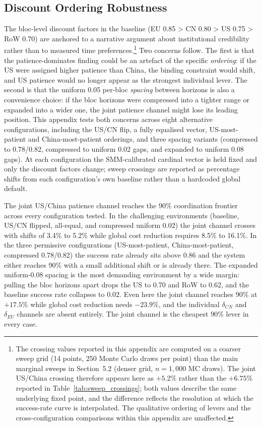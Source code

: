 \documentclass[10pt,a4paper]{article}
\begin{document}
\clearpage
\needspace{12em}
\subsection{Discount Ordering Robustness}

The bloc-level discount factors in the baseline (EU 0.85 > CN 0.80 > US 0.75 > RoW 0.70) are anchored to a narrative argument about institutional credibility rather than to measured time preferences.\footnote{The crossing values reported in this appendix are computed on a coarser sweep grid (14 points, 250 Monte Carlo draws per point) than the main marginal sweeps in Section~5.2 (denser grid, $n=1{,}000$ MC draws). The joint US/China crossing therefore appears here as $+5.2\%$ rather than the $+6.75\%$ reported in Table~\ref{tab:sweep_crossings}; both values describe the same underlying fixed point, and the difference reflects the resolution at which the success-rate curve is interpolated. The qualitative ordering of levers and the cross-configuration comparisons within this appendix are unaffected.} Two concerns follow. The first is that the patience-dominates finding could be an artefact of the specific \emph{ordering}: if the US were assigned higher patience than China, the binding constraint would shift, and US patience would no longer appear as the strongest individual lever. The second is that the uniform 0.05 per-bloc \emph{spacing} between horizons is also a convenience choice: if the bloc horizons were compressed into a tighter range or expanded into a wider one, the joint patience channel might lose its leading position. This appendix tests both concerns across eight alternative configurations, including the US/CN flip, a fully equalised vector, US-most-patient and China-most-patient orderings, and three spacing variants (compressed to 0.78/0.82, compressed to uniform 0.02 gaps, and expanded to uniform 0.08 gaps). At each configuration the SMM-calibrated cardinal vector is held fixed and only the discount factors change; sweep crossings are reported as percentage shifts from each configuration's own baseline rather than a hardcoded global default.

\FloatBarrier
\FloatBarrier

The joint US/China patience channel reaches the 90\% coordination frontier across every configuration tested. In the challenging environments (baseline, US/CN flipped, all-equal, and compressed uniform 0.02) the joint channel crosses with shifts of 3.4\% to 5.2\% while global cost reduction requires 8.5\% to 16.1\%. In the three permissive configurations (US-most-patient, China-most-patient, compressed 0.78/0.82) the success rate already sits above 0.86 and the system either reaches 90\% with a small additional shift or is already there. The expanded uniform-0.08 spacing is the most demanding environment by a wide margin: pulling the bloc horizons apart drops the US to 0.70 and RoW to 0.62, and the baseline success rate collapses to 0.02. Even here the joint channel reaches 90\% at $+17.5\%$ while global cost reduction needs $-23.9\%$, and the individual $\delta_{CN}$ and $\delta_{EU}$ channels are absent entirely. The joint channel is the cheapest 90\% lever in every case.
\end{document}
